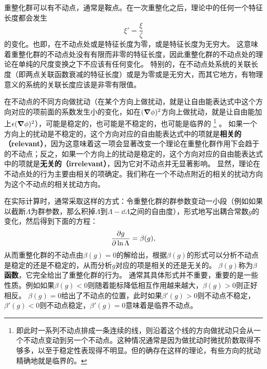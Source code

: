 \documentclass[hyperref, UTF8, a4paper]{ctexart}
\begin{document}
重整化群可以有不动点，通常是鞍点。在一次重整化之后，理论中的任何一个特征长度都会发生
\[
    \xi' = \frac{\xi}{\zeta}
\]
的变化。也即，在不动点处或是特征长度为零，或是特征长度为无穷大。
这意味着重整化群的不动点处没有有限而非零的特征长度，因此重整化群的不动点处的理论在单纯的尺度变换之下不应该有任何变化。
特别的，在不动点处系统的关联长度（即两点关联函数衰减的特征长度）或是为零或是无穷大，而其它地方，有物理意义的系统的关联长度应该是非零有限值。

在不动点的不同方向做扰动（在某个方向上做扰动，就是让自由能表达式中这个方向对应的项前面的系数发生小的变化，如在$(\grad{\phi})^2$方向上做扰动，就是让自由能加上$\epsilon (\grad{\phi})^2$），可能是稳定的，也可能是不稳定的，也可能是临界的
\footnote{即此时一系列不动点排成一条连续的线，则沿着这个线的方向做扰动只会从一个不动点变动到另一个不动点。这种情况通常是因为做扰动时微扰阶数取得不够多，以至于稳定性表现得不明显。但的确存在这样的理论，有些方向的扰动精确地就是临界的。}%
。
如果一个方向上的扰动是不稳定的，这个方向对应的自由能表达式中的项就是\textbf{相关的（relevant）}，因为这意味着这一项会显著改变一个理论在重整化群作用下会趋于的不动点；反之，如果一个方向上的扰动是稳定的，这个方向对应的自由能表达式中的项就是\textbf{无关的（irrelevant）}，因为它对不动点并无显著影响。
显然，理论在不动点处的行为主要由相关的项确定。我们称在一个不动点附近的相关的扰动方向为这个不动点的相关扰动方向。

在实际计算时，通常采取这样的方式：令重整化群的群参数变动一小段（例如如果以截断$\Lambda$为群参数，那么积掉$\Lambda$到$\Lambda-\dd{\Lambda}$之间的自由度），形式地写出耦合常数$g$的变化，然后得到下面的方程：
\begin{equation}
    \pdv{g}{\ln \Lambda} = \beta(g),
\end{equation}
从而重整化群的不动点由$\beta(g)=0$的解给出，根据$\beta(g)$的形式可以分析不动点是稳定的还是不稳定的，从而分析$g$对应的项是相关的还是无关的。
$\beta(g)$称为\textbf{$\beta$函数}，它完全给出了重整化群的行为。
通常其具体形式并不重要，重要的是一些性质。例如如果$\beta(g) < 0$则随着能标降低相互作用越来越大，$\beta(g) > 0$则正好相反。
$\beta(g) = 0$给出了不动点的位置，此时如果$\beta'(g) > 0$则不动点不稳定，$\beta'(g) < 0$则不动点稳定，$\beta'(g) = 0$意味着是临界不动点。
\end{document}
